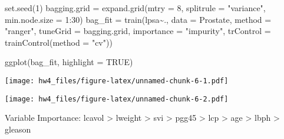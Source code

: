 \documentclass[
]{article}
\newenvironment{Shaded}{\begin{snugshade}}{\end{snugshade}}
\newcommand{\AttributeTok}[1]{\textcolor[rgb]{0.77,0.63,0.00}{#1}}
\newcommand{\ConstantTok}[1]{\textcolor[rgb]{0.00,0.00,0.00}{#1}}
\newcommand{\DecValTok}[1]{\textcolor[rgb]{0.00,0.00,0.81}{#1}}
\newcommand{\FloatTok}[1]{\textcolor[rgb]{0.00,0.00,0.81}{#1}}
\newcommand{\FunctionTok}[1]{\textcolor[rgb]{0.00,0.00,0.00}{#1}}
\newcommand{\NormalTok}[1]{#1}
\newcommand{\OtherTok}[1]{\textcolor[rgb]{0.56,0.35,0.01}{#1}}
\newcommand{\SpecialCharTok}[1]{\textcolor[rgb]{0.00,0.00,0.00}{#1}}
\newcommand{\StringTok}[1]{\textcolor[rgb]{0.31,0.60,0.02}{#1}}
\begin{document}
\begin{Shaded}
\begin{Highlighting}[]
\FunctionTok{set.seed}\NormalTok{(}\DecValTok{1}\NormalTok{)}
\NormalTok{bagging.grid }\OtherTok{=} \FunctionTok{expand.grid}\NormalTok{(}\AttributeTok{mtry =} \DecValTok{8}\NormalTok{,}
                           \AttributeTok{splitrule =} \StringTok{"variance"}\NormalTok{,}
                           \AttributeTok{min.node.size =} \DecValTok{1}\SpecialCharTok{:}\DecValTok{30}\NormalTok{)}
\NormalTok{bag\_fit }\OtherTok{=} \FunctionTok{train}\NormalTok{(lpsa}\SpecialCharTok{\textasciitilde{}}\NormalTok{.,}
                \AttributeTok{data =}\NormalTok{ Prostate,}
                \AttributeTok{method =} \StringTok{"ranger"}\NormalTok{,}
                \AttributeTok{tuneGrid =}\NormalTok{ bagging.grid,}
                \AttributeTok{importance =} \StringTok{"impurity"}\NormalTok{,}
                \AttributeTok{trControl =} \FunctionTok{trainControl}\NormalTok{(}\AttributeTok{method =} \StringTok{"cv"}\NormalTok{))}

\FunctionTok{ggplot}\NormalTok{(bag\_fit, }\AttributeTok{highlight =} \ConstantTok{TRUE}\NormalTok{)}
\end{Highlighting}
\end{Shaded}

\texttt{[image: hw4\_files/figure-latex/unnamed-chunk-6-1.pdf]}

\begin{Shaded}
\end{Shaded}

\texttt{[image: hw4\_files/figure-latex/unnamed-chunk-6-2.pdf]}

Variable Importance: lcavol \textgreater{} lweight \textgreater{} svi
\textgreater{} pgg45 \textgreater{} lcp \textgreater{} age
\textgreater{} lbph \textgreater{} gleason
\end{document}
